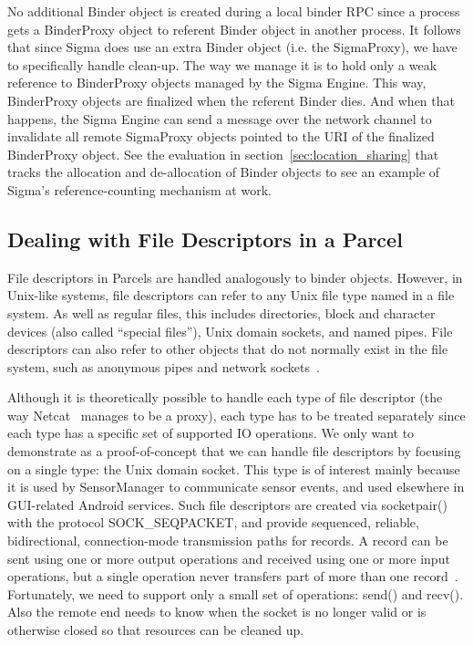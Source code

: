 \documentclass[prodmode]{acmlarge}
\begin{document}
No additional Binder object is created during a local binder RPC since a process gets a BinderProxy object to referent Binder object in another process. It follows that since Sigma does use an extra Binder object (i.e. the SigmaProxy), we have to specifically handle clean-up. The way we manage it is to hold only a weak reference to BinderProxy objects managed by the Sigma Engine. This way, BinderProxy objects are finalized when the referent Binder dies. And when that happens, the Sigma Engine can send a message over the network channel to invalidate all remote SigmaProxy objects pointed to the URI of the finalized BinderProxy object. See the evaluation in section~\ref{sec:location_sharing} that tracks the allocation and de-allocation of Binder objects to see an example of Sigma's reference-counting mechanism at work.

\subsection{Dealing with File Descriptors in a Parcel}
File descriptors in Parcels are handled analogously to binder objects. However, in Unix-like systems, file descriptors can refer to any Unix file type named in a file system. As well as regular files, this includes directories, block and character devices (also called ``special files''), Unix domain sockets, and named pipes. File descriptors can also refer to other objects that do not normally exist in the file system, such as anonymous pipes and network sockets~\cite{UnixDomainSocket}.

Although it is theoretically possible to handle each type of file descriptor (the way Netcat~\cite{NetCatProxy} manages to be a proxy), each type has to be treated separately since each type has a specific set of supported IO operations. We only want to demonstrate as a proof-of-concept that we can handle file descriptors by focusing on a single type: the Unix domain socket. This type is of interest mainly because it is used by SensorManager to communicate sensor events, and used elsewhere in GUI-related Android services. Such file descriptors are created via socketpair() with the protocol SOCK\_SEQPACKET, and provide sequenced, reliable, bidirectional, connection-mode transmission paths for records. A record can be sent using one or more output operations and received using one or more input operations, but a single operation never transfers part of more than one record~\cite{SocketManPage}. Fortunately, we need to support only a small set of operations: send() and recv(). Also the remote end needs to know when the socket is no longer valid or is otherwise closed so that resources can be cleaned up.
\end{document}
